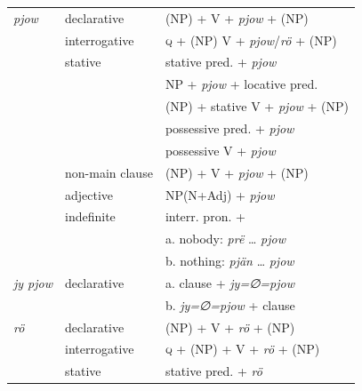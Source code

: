 \documentclass[output=paper,colorlinks,citecolor=brown,draft]{langscibook}
\begin{document}
\begin{table}%
\begin{tabular}{lll}
\lsptoprule
    \textit{pjow}       & declarative               & (NP) + V + \textit{pjow} + (NP) \\
   
                        & interrogative             & \textsc{q} + (NP) V + \textit{pjow}/\textit{rö} + (NP) \\
                        & stative                   & stative pred. + \textit{pjow} \\
                        &                           & NP + \textit{pjow} + locative pred. \\
                        &                           & (NP) + stative V + \textit{pjow} + (NP) \\
                        &                           & possessive pred. + \textit{pjow} \\
                        &                           & possessive V + \textit{pjow} \\
                        & non-main clause           & (NP) + V + \textit{pjow} + (NP)              \\
                        & adjective                 & NP(N+Adj) + \textit{pjow}  \\
                        & indefinite                & interr. pron. + \Neg{}\\
                        &                           & a. nobody: \textit{prë} \dots{} \textit{pjow} \\
                        &                           & b. nothing: \textit{pjän} \dots{} \textit{pjow}  \medskip\\
        \hline
    \textit{jy pjow}    &   declarative             & a. clause + \textit{jy=∅=pjow} \\
                        &                           & b.  \textit{jy=∅=pjow} + clause               \medskip\\
    \hline
    \textit{rö}         & declarative               & (NP) + V + \textit{rö} + (NP) \\
                        & interrogative             & \textsc{q} + (NP) + V + \textit{rö} + (NP) \\
                        & stative                   & stative pred. + \textit{rö} \\

\end{tabular}
\end{table}
\end{document}
